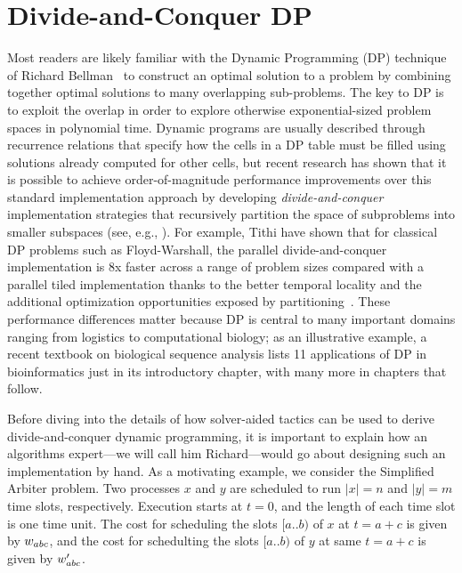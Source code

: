 \section{Divide-and-Conquer DP}
\label{divide}

Most readers are likely familiar with the Dynamic Programming (DP) technique of Richard Bellman~\cite{03/Bellman:DP} to construct an optimal solution to a problem by combining together optimal solutions to many overlapping sub-problems. The key to DP is to exploit the overlap in order to explore otherwise exponential-sized problem spaces in polynomial time. Dynamic programs are usually described through recurrence relations that specify how the cells in a DP table must be filled using solutions already computed for other cells, but recent research has shown that it is possible to achieve order-of-magnitude performance improvements over this standard implementation approach by developing \emph{divide-and-conquer}  implementation strategies that recursively
partition the space of subproblems into smaller subspaces (see, e.g., \cite{IPDPS15/Tithi}).   For example, Tithi \etal{} have shown that for classical DP problems such as Floyd-Warshall, the parallel divide-and-conquer implementation is  8x faster  across a range of problem sizes compared with a parallel tiled implementation thanks to the better temporal locality and the additional optimization opportunities exposed by partitioning~\cite{IPDPS15/Tithi}. These performance differences matter because  DP is central to many important domains ranging from logistics to computational biology; as an illustrative example, a recent textbook \cite{DurbinEdKr98} on biological sequence analysis lists 11 applications of DP in bioinformatics just in its introductory chapter, with many more in chapters that follow.



Before diving into the details of how solver-aided tactics can be used to derive divide-and-conquer dynamic programming, it is important to explain how an algorithms expert---we will call him Richard---would go about designing such an implementation by hand.
As a motivating example, we consider the Simplified Arbiter problem.
Two processes $x$ and $y$ are scheduled to run $|x|=n$ and $|y|=m$ time slots,
respectively. Execution starts at $t=0$, and the length of each time slot is
one time unit. The cost for scheduling the slots $[a..b)$ of $x$ at $t=a+c$
is given by $w_{abc}$, and the cost for schedulting the slots $[a..b)$ of $y$
at same $t=a+c$ is given by $w'_{abc}$.


